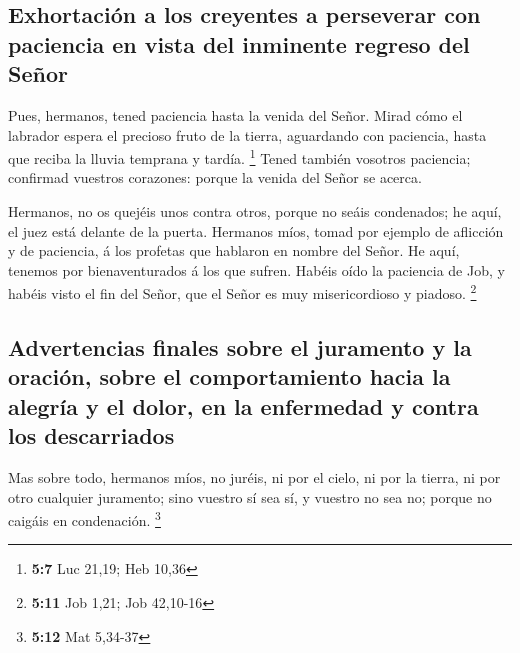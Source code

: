 \hypertarget{exhortaciuxf3n-a-los-creyentes-a-perseverar-con-paciencia-en-vista-del-inminente-regreso-del-seuxf1or}{%
\subsection{Exhortación a los creyentes a perseverar con paciencia en
vista del inminente regreso del
Señor}\label{exhortaciuxf3n-a-los-creyentes-a-perseverar-con-paciencia-en-vista-del-inminente-regreso-del-seuxf1or}}

 Pues, hermanos, tened paciencia hasta la venida del
Señor. Mirad cómo el labrador espera el precioso fruto de la tierra,
aguardando con paciencia, hasta que reciba la lluvia temprana y tardía.
\footnote{\textbf{5:7} Luc 21,19; Heb 10,36}  Tened
también vosotros paciencia; confirmad vuestros corazones: porque la
venida del Señor se acerca.

 Hermanos, no os quejéis unos contra otros, porque no
seáis condenados; he aquí, el juez está delante de la puerta.
 Hermanos míos, tomad por ejemplo de aflicción y de
paciencia, á los profetas que hablaron en nombre del Señor.
 He aquí, tenemos por bienaventurados á los que sufren.
Habéis oído la paciencia de Job, y habéis visto el fin del Señor, que el
Señor es muy misericordioso y piadoso. \footnote{\textbf{5:11} Job 1,21;
  Job 42,10-16}

\hypertarget{advertencias-finales-sobre-el-juramento-y-la-oraciuxf3n-sobre-el-comportamiento-hacia-la-alegruxeda-y-el-dolor-en-la-enfermedad-y-contra-los-descarriados}{%
\subsection{Advertencias finales sobre el juramento y la oración, sobre
el comportamiento hacia la alegría y el dolor, en la enfermedad y contra
los
descarriados}\label{advertencias-finales-sobre-el-juramento-y-la-oraciuxf3n-sobre-el-comportamiento-hacia-la-alegruxeda-y-el-dolor-en-la-enfermedad-y-contra-los-descarriados}}

 Mas sobre todo, hermanos míos, no juréis, ni por el
cielo, ni por la tierra, ni por otro cualquier juramento; sino vuestro
sí sea sí, y vuestro no sea no; porque no caigáis en condenación.
\footnote{\textbf{5:12} Mat 5,34-37}

